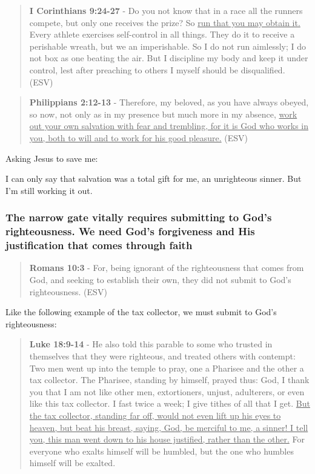 \documentclass[11pt]{article}
\begin{document}
\begin{quote}
\textbf{I Corinthians 9:24-27} - Do you not know that in a race all the runners compete, but only one receives the prize? So \uline{run that you may obtain it.} Every athlete exercises self-control in all things. They do it to receive a perishable wreath, but we an imperishable. So I do not run aimlessly; I do not box as one beating the air. But I discipline my body and keep it under control, lest after preaching to others I myself should be disqualified. (ESV)
\end{quote}

\begin{quote}
\textbf{Philippians 2:12-13} - Therefore, my beloved, as you have always obeyed, so now, not only as in my presence but much more in my absence, \uline{work out your own salvation with fear and trembling, for it is God who works in you, both to will and to work for his good pleasure.} (ESV)
\end{quote}

Asking Jesus to save me:

I can only say that salvation was a total gift for me, an unrighteous sinner. But I'm still working it out.

\subsubsection{The narrow gate vitally requires submitting to God's righteousness. We need God's forgiveness and His justification that comes through faith}
\label{sec:org8dad83e}
\begin{quote}
\textbf{Romans 10:3} - For, being ignorant of the righteousness that comes from God, and seeking to establish their own, they did not submit to God's righteousness. (ESV)
\end{quote}

Like the following example of the tax collector, we must submit to God's righteousness:

\begin{quote}
\textbf{Luke 18:9-14} - He also told this parable to some who trusted in themselves that they were righteous, and treated others with contempt: Two men went up into the temple to pray, one a Pharisee and the other a tax collector. The Pharisee, standing by himself, prayed thus: God, I thank you that I am not like other men, extortioners, unjust, adulterers, or even like this tax collector. I fast twice a week; I give tithes of all that I get. \uline{But the tax collector, standing far off, would not even lift up his eyes to heaven, but beat his breast, saying, God, be merciful to me, a sinner! I tell you, this man went down to his house justified, rather than the other.} For everyone who exalts himself will be humbled, but the one who humbles himself will be exalted.
\end{quote}
\end{document}
